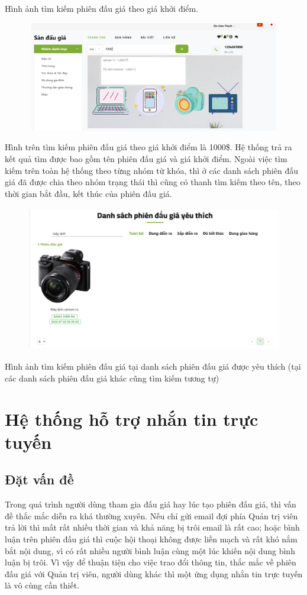 \documentclass[../DoAn.tex]{subfiles}
\begin{document}
Hình ảnh tìm kiếm phiên đấu giá theo giá khởi điểm.
\begin{figure}[H]
    \centering
    \includegraphics[width=11.4cm,height=4.82cm]{Hinhve/searchprice.png}
\end{figure}
Hình trên tìm kiếm phiên đấu giá theo giá khởi điểm là 1000\$. Hệ thống trả ra kết quả tìm được bao gồm tên phiên đấu giá và giá khởi điểm.
Ngoài việc tìm kiếm trên toàn hệ thống theo từng nhóm từ khóa, thì ở các danh sách phiên đấu giá đã được chia theo nhóm trạng thái thì cũng có thanh tìm kiếm theo tên, theo thời gian bắt đầu, kết thúc của phiên đấu giá. 
\begin{figure}[H]
    \centering
    \includegraphics[width=11.4cm,height=6.36cm]{Hinhve/searchlike.png}
\end{figure}
Hình ảnh tìm kiếm phiên đấu giá tại danh sách phiên đấu giá được yêu thích (tại các danh sách phiên đấu giá khác cũng tìm kiếm tương tự)
\section{Hệ thống hỗ trợ nhắn tin trực tuyến}
\subsection{Đặt vấn đề}
Trong quá trình người dùng tham gia đấu giá hay lúc tạo phiên đấu giá, thì vấn đề thắc mắc diễn ra khá thường xuyên.  Nếu chỉ gửi email đợi phía Quản trị viên trả lời thì mất rất nhiều thời gian và khả năng bị trôi email là rất cao; hoặc bình luận trên phiên đấu giá thì cuộc hội thoại không được liền mạch và rất khó nắm bắt nội dung, vì có rất nhiều người bình luận cùng một lúc khiến nội dung bình luận bị trôi. Vì vậy để thuận tiện cho việc trao đổi thông tin, thắc mắc về phiên đấu giá với Quản trị viên, người dùng khác thì một ứng dụng nhắn tin trực tuyến là vô cùng cần thiết. 
\end{document}
